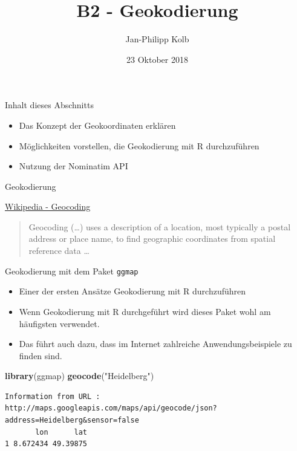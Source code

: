 \documentclass[ignorenonframetext,]{beamer}
\title{B2 - Geokodierung}
\author{Jan-Philipp Kolb}
\date{23 Oktober 2018}
\newenvironment{Shaded}{\begin{snugshade}}{\end{snugshade}}
\newcommand{\KeywordTok}[1]{\textcolor[rgb]{0.26,0.66,0.93}{\textbf{#1}}}
\newcommand{\NormalTok}[1]{\textcolor[rgb]{0.74,0.68,0.62}{#1}}
\newcommand{\StringTok}[1]{\textcolor[rgb]{0.02,0.61,0.04}{#1}}
\providecommand{\tightlist}{%
  \setlength{\itemsep}{0pt}\setlength{\parskip}{0pt}}
\begin{document}
\frame{\titlepage}

\begin{frame}{Inhalt dieses Abschnitts}
\protect\hypertarget{inhalt-dieses-abschnitts}{}

\begin{itemize}
\tightlist
\item
  Das Konzept der Geokoordinaten erklären
\item
  Möglichkeiten vorstellen, die Geokodierung mit R durchzuführen
\item
  Nutzung der Nominatim API
\end{itemize}

\end{frame}

\begin{frame}{Geokodierung}
\protect\hypertarget{geokodierung}{}

\begin{block}{\href{https://github.com/adam-p/markdown-here/wiki/Markdown-Cheatsheet\#blockquotes}{Wikipedia
- Geocoding}}

\begin{quote}
Geocoding (\ldots{}) uses a description of a location, most typically a
postal address or place name, to find geographic coordinates from
spatial reference data \ldots{}
\end{quote}

\end{block}

\end{frame}

\begin{frame}[fragile]{Geokodierung mit dem Paket \texttt{ggmap}}
\protect\hypertarget{geokodierung-mit-dem-paket-ggmap}{}

\begin{itemize}
\tightlist
\item
  Einer der ersten Ansätze Geokodierung mit R durchzuführen
\item
  Wenn Geokodierung mit R durchgeführt wird dieses Paket wohl am
  häufigsten verwendet.
\item
  Das führt auch dazu, dass im Internet zahlreiche Anwendungsbeispiele
  zu finden sind.
\end{itemize}

\begin{Shaded}
\begin{Highlighting}[]
\KeywordTok{library}\NormalTok{(ggmap)}
\KeywordTok{geocode}\NormalTok{(}\StringTok{"Heidelberg"}\NormalTok{)}
\end{Highlighting}
\end{Shaded}

\begin{verbatim}
Information from URL : http://maps.googleapis.com/maps/api/geocode/json?address=Heidelberg&sensor=false
       lon      lat
1 8.672434 49.39875
\end{verbatim}

\end{frame}
\end{document}
